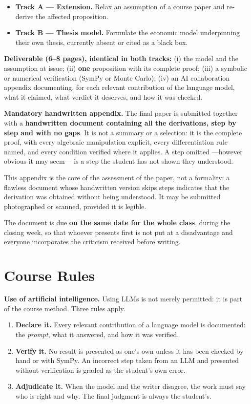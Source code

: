 \documentclass[11pt]{article}
\begin{document}
\begin{itemize}
\item \textbf{Track A --- Extension.} Relax an assumption of a course paper and re-derive the affected proposition.
\item \textbf{Track B --- Thesis model.} Formulate the economic model underpinning their own thesis, currently absent or cited as a black box.
\end{itemize}

\textbf{Deliverable (6--8 pages), identical in both tracks:} (i) the model and the assumption at issue; (ii) \textbf{one} proposition with its complete proof; (iii) a symbolic or numerical verification (SymPy or Monte Carlo); (iv) an AI collaboration appendix documenting, for each relevant contribution of the language model, what it claimed, what verdict it deserves, and how it was checked.

\textbf{Mandatory handwritten appendix.} The final paper is submitted together with a \textbf{handwritten document containing all the derivations, step by step and with no gaps}. It is not a summary or a selection: it is the complete proof, with every algebraic manipulation explicit, every differentiation rule named, and every condition verified where it applies. A step omitted ---however obvious it may seem--- is a step the student has not shown they understood.

This appendix is the core of the assessment of the paper, not a formality: a flawless document whose handwritten version skips steps indicates that the derivation was obtained without being understood. It may be submitted photographed or scanned, provided it is legible.

The document is due \textbf{on the same date for the whole class}, during the closing week, so that whoever presents first is not put at a disadvantage and everyone incorporates the criticism received before writing.

\section{Course Rules}

\textbf{Use of artificial intelligence.} Using LLMs is not merely permitted: it is part of the course method. Three rules apply.

\begin{enumerate}
\item \textbf{Declare it.} Every relevant contribution of a language model is documented: the \emph{prompt}, what it answered, and how it was verified.
\item \textbf{Verify it.} No result is presented as one's own unless it has been checked by hand or with SymPy. An incorrect step taken from an LLM and presented without verification is graded as the student's own error.
\item \textbf{Adjudicate it.} When the model and the writer disagree, the work must say who is right and why. The final judgment is always the student's.
\end{enumerate}
\end{document}
